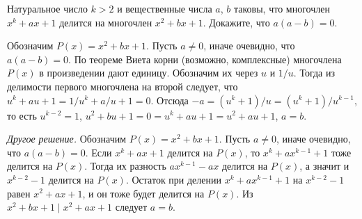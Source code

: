 Натуральное число $k > 2$ и вещественные числа $a$, $b$ таковы, что
многочлен $x^k + a x + 1$ делится на многочлен $x^2 + b x + 1$.
Докажите, что $a (a - b) = 0$.

\solution
Обозначим $P(x) = x^2 + b x + 1$.
Пусть $a \neq 0$, иначе очевидно, что $a (a - b) = 0$.
По теореме Виета корни (возможно, комплексные) многочлена $P(x)$ в произведении
дают единицу.
Обозначим их через $u$ и $1 / u$.
Тогда из делимости первого многочлена на второй следует, что
$u^k + a u + 1 = 1 / u^k + a / u + 1 = 0$.
Отсюда
$-a = (u^k + 1) / u = (u^k + 1) / u^{k - 1}$,
то есть $u^{k - 2} = 1$,
$u^2 + b u + 1 = 0 = u^k + a u + 1 = u^2 + a u + 1$, $a = b$.
\par
\emph{Другое решение.}
Обозначим $P(x) = x^2 + b x + 1$.
Пусть $a \neq 0$, иначе очевидно, что $a (a - b) = 0$.
Если $x^k + a x + 1$ делится на $P(x)$, то $x^k + a x^{k - 1} + 1$ тоже делится
на $P(x)$.
Тогда их разность $a x^{k - 1} - a x$ делится на $P(x)$, а значит и
$x^{k - 2} - 1$ делится на $P(x)$.
Остаток при делении $x^k + a x^{k - 1} + 1$ на $x^{k - 2} - 1$ равен
$x^2 + a x + 1$, и он тоже будет делится на $P(x)$.
Из $x^2 + b x + 1 \mid x^2 + a x + 1$ следует $a = b$.

